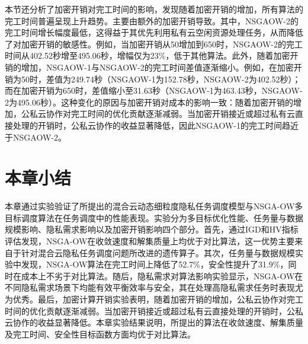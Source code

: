 
本节还分析了加密开销对完工时间的影响，发现随着加密开销的增加，所有算法的完工时间普遍呈现上升趋势。主要由额外的加密开销导致。其中，NSGAOW-2的完工时间增长幅度最低，这得益于其优先利用私有云空闲资源处理任务，从而降低了对加密开销的敏感性。例如，当加密开销从50增加到650时，NSGAOW-2的完工时间从402.52秒增至495.06秒，增幅仅为23\%，低于其他算法。此外，随着加密开销的增加，NSGAOW-1与NSGAOW-2的完工时间差值逐渐缩小。例如，在加密开销为50时，差值为249.74秒（NSGAOW-1为152.78秒，NSGAOW-2为402.52秒）；而在加密开销为650时，差值缩小至31.63秒（NSGAOW-1为463.43秒，NSGAOW-2为495.06秒）。这种变化的原因与加密开销对成本的影响一致：随着加密开销的增加，公私云协作对完工时间的优化贡献逐渐减弱。当加密开销接近或超过私有云直接处理的开销时，公私云协作的收益显著降低，因此NSGAOW-1的完工时间趋近于NSGAOW-2。

\section{本章小结}

本章通过实验验证了所提出的混合云动态细粒度隐私任务调度模型与NSGA-OW多目标调度算法在任务调度中的性能表现。实验分为多目标优化性能、任务量与数据规模影响、隐私需求影响以及加密开销影响四个部分。首先，通过IGD和HV指标评估发现，NSGA-OW在收敛速度和解集质量上均优于对比算法，这一优势主要来自于针对混合云隐私任务调度问题所改进的遗传算子。其次，任务量与数据规模实验中发现，NSGA-OW算法在完工时间上降低了52.7\%，安全性提升了31.9\%，同时在成本上不劣于对比算法。随后，隐私需求对算法影响实验显示，NSGA-OW在不同隐私需求场景下均能有效平衡效率与安全，其在处理高隐私需求任务时表现尤为优秀。最后，加密计算开销实验表明，随着加密开销的增加，公私云协作对完工时间的优化贡献逐渐减弱。当加密开销接近或超过私有云直接处理的开销时，公私云协作的收益显著降低。本章实验结果说明，所提出的算法在收敛速度、解集质量及完工时间、安全性目标函数方面均优于对比算法。
